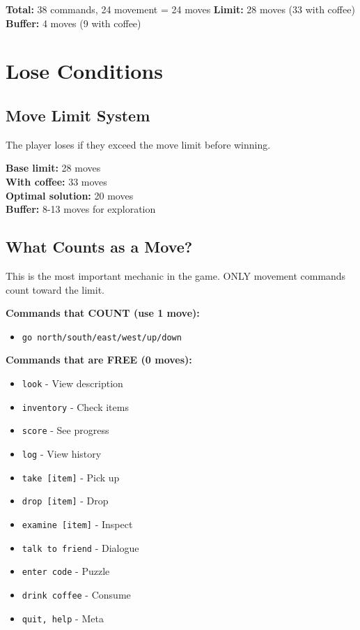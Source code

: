 \documentclass[12pt]{article}
\begin{document}
\textbf{Total:} 38 commands, 24 movement = 24 moves  
\textbf{Limit:} 28 moves (33 with coffee)  
\textbf{Buffer:} 4 moves (9 with coffee)

\section{Lose Conditions}

\subsection{Move Limit System}

The player loses if they exceed the move limit before winning.

\textbf{Base limit:} 28 moves \\
\textbf{With coffee:} 33 moves \\
\textbf{Optimal solution:} 20 moves \\
\textbf{Buffer:} 8-13 moves for exploration

\subsection{What Counts as a Move?}

This is the most important mechanic in the game. ONLY movement commands count toward the limit.

\textbf{Commands that COUNT (use 1 move):}
\begin{itemize}
\item \texttt{go north/south/east/west/up/down}
\end{itemize}

\textbf{Commands that are FREE (0 moves):}
\begin{itemize}
\item \texttt{look} - View description
\item \texttt{inventory} - Check items
\item \texttt{score} - See progress
\item \texttt{log} - View history
\item \texttt{take [item]} - Pick up
\item \texttt{drop [item]} - Drop
\item \texttt{examine [item]} - Inspect
\item \texttt{talk to friend} - Dialogue
\item \texttt{enter code} - Puzzle
\item \texttt{drink coffee} - Consume
\item \texttt{quit, help} - Meta
\end{itemize}
\end{document}
